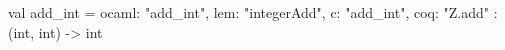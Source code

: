 val add_int = {ocaml: "add_int", lem: "integerAdd", c: "add_int", coq: "Z.add"} : (int, int) -> int
